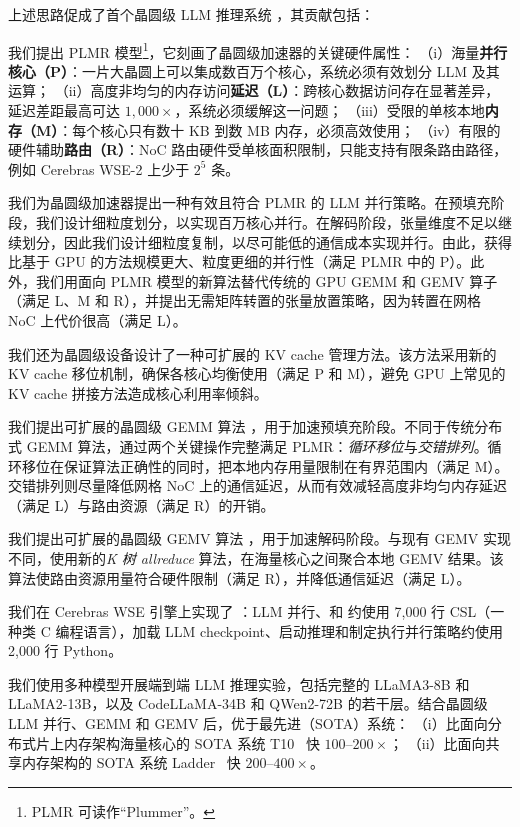 上述思路促成了首个晶圆级 LLM 推理系统 \sys，其贡献包括：

我们提出 PLMR 模型\footnote{PLMR 可读作“Plummer”。}，它刻画了晶圆级加速器的关键硬件属性：
（i）海量\textbf{并行核心（P）}：一片大晶圆上可以集成数百万个核心，系统必须有效划分 LLM 及其运算；
（ii）高度非均匀的内存访问\textbf{延迟（L）}：跨核心数据访问存在显著差异，延迟差距最高可达 $1{,}000\times$，系统必须缓解这一问题；
（iii）受限的单核本地\textbf{内存（M）}：每个核心只有数十 KB 到数 MB 内存，必须高效使用；
（iv）有限的硬件辅助\textbf{路由（R）}：NoC 路由硬件受单核面积限制，只能支持有限条路由路径，例如 Cerebras WSE-2 上少于 $2^5$ 条。

我们为晶圆级加速器提出一种有效且符合 PLMR 的 LLM 并行策略。在预填充阶段，我们设计细粒度划分，以实现百万核心并行。在解码阶段，张量维度不足以继续划分，因此我们设计细粒度复制，以尽可能低的通信成本实现并行。由此，\sys 获得比基于 GPU 的方法规模更大、粒度更细的并行性（满足 PLMR 中的 P）。此外，我们用面向 PLMR 模型的新算法替代传统的 GPU GEMM 和 GEMV 算子（满足 L、M 和 R），并提出无需矩阵转置的张量放置策略，因为转置在网格 NoC 上代价很高（满足 L）。

我们还为晶圆级设备设计了一种可扩展的 KV cache 管理方法。该方法采用新的 KV cache 移位机制，确保各核心均衡使用（满足 P 和 M），避免 GPU 上常见的 KV cache 拼接方法造成核心利用率倾斜。

我们提出可扩展的晶圆级 GEMM 算法 \gemm，用于加速预填充阶段。不同于传统分布式 GEMM 算法，\gemm 通过两个关键操作完整满足 PLMR：\emph{循环移位}与\emph{交错排列}。循环移位在保证算法正确性的同时，把本地内存用量限制在有界范围内（满足 M）。交错排列则尽量降低网格 NoC 上的通信延迟，从而有效减轻高度非均匀内存延迟（满足 L）与路由资源（满足 R）的开销。

我们提出可扩展的晶圆级 GEMV 算法 \gemv，用于加速解码阶段。与现有 GEMV 实现不同，\gemv 使用新的\emph{K 树 allreduce} 算法，在海量核心之间聚合本地 GEMV 结果。该算法使路由资源用量符合硬件限制（满足 R），并降低通信延迟（满足 L）。

\vspace{0.2cm}
\noindent
我们在 Cerebras WSE 引擎上实现了 \sys：LLM 并行、\gemm 和 \gemv 约使用 7,000 行 CSL（一种类 C 编程语言），加载 LLM checkpoint、启动推理和制定执行并行策略约使用 2,000 行 Python。

我们使用多种模型开展端到端 LLM 推理实验，包括完整的 LLaMA3-8B 和 LLaMA2-13B，以及 CodeLLaMA-34B 和 QWen2-72B 的若干层。结合晶圆级 LLM 并行、GEMM 和 GEMV 后，\sys 优于最先进（SOTA）系统：
（i）比面向分布式片上内存架构海量核心的 SOTA 系统 T10~\cite{t10} 快 $100$--$200\times$；
（ii）比面向共享内存架构的 SOTA 系统 Ladder~\cite{ladder} 快 $200$--$400\times$。

